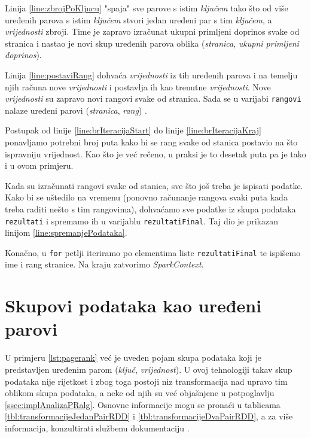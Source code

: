 \documentclass[times, utf8, zavrsni, numeric]{fer}
\begin{document}
Linija \ref{line:zbrojPoKljucu} "spaja" sve parove s istim \emph{ključem} tako što od više uređenih parova s istim \emph{ključem} stvori jedan uređeni par s tim \emph{ključem}, a \emph{vrijednosti} zbroji. Time je zapravo izračunat ukupni primljeni doprinos svake od stranica i nastao je novi skup uređenih parova oblika (\emph{stranica}, \emph{ukupni primljeni doprinos}). 

Linija \ref{line:postaviRang} dohvaća \emph{vrijednosti} iz tih uređenih parova i na temelju njih računa nove \emph{vrijednosti} i postavlja ih kao trenutne \emph{vrijednosti}. Nove \emph{vrijednosti} su zapravo novi rangovi svake od stranica. Sada se u varijabi \texttt{rangovi} nalaze uređeni parovi (\emph{stranica}, \emph{rang}) . 

Postupak od linije \ref{line:brIteracijaStart} do linije \ref{line:brIteracijaKraj} ponavljamo potrebni broj puta kako bi se rang svake od stanica postavio na što ispravniju vrijednost. Kao što je već rečeno, u praksi je to desetak puta pa je tako i u ovom primjeru.

Kada su izračunati rangovi svake od stanica, sve što još treba je ispisati podatke. Kako bi se uštedilo na vremenu (ponovno računanje rangova svaki puta kada treba raditi nešto s tim rangovima), dohvaćamo sve podatke iz skupa podataka \texttt{rezultati} i spremamo ih u varijablu \texttt{rezultatiFinal}. Taj dio je prikazan linijom \ref{line:spremanjePodataka}.

Konačno, u \texttt{for} petlji iteriramo po elementima liste \texttt{rezultatiFinal} te ispišemo ime i rang stranice. Na kraju zatvorimo \emph{SparkContext}.


\section{Skupovi podataka kao uređeni parovi}
U primjeru \ref{lst:pagerank} već je uveden pojam skupa podataka koji je predstavljen uređenim parom (\emph{ključ}, \emph{vrijednost}). U ovoj tehnologiji takav skup podataka nije rijetkost i zbog toga postoji niz transformacija nad upravo tim oblikom skupa podataka, a neke od njih su već objašnjene u potpoglavlju \ref{ssec:implAnalizaPRalg}. Osnovne informacije mogu se pronaći u tablicama \ref{tbl:transformacijeJedanPairRDD} i \ref{tbl:transformacijeDvaPairRDD}, a za više informacija, konzultirati službenu dokumentaciju \cite{officialDocumentation}.
\end{document}
